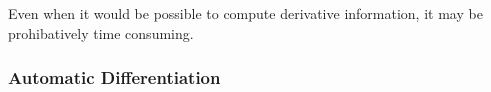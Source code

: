



Even when it would be possible to compute derivative information, it may be prohibatively time consuming.












%



\subsubsection{Automatic Differentiation}

